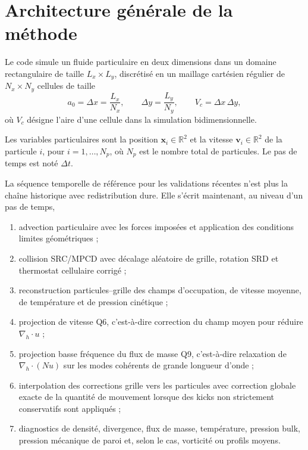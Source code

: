 \documentclass[11pt,a4paper]{article}
\begin{document}
\section{Architecture générale de la méthode}

Le code simule un fluide particulaire en deux dimensions dans un domaine rectangulaire de taille $L_x \times L_y$, discrétisé en un maillage cartésien régulier de $N_x \times N_y$ cellules de taille
\begin{equation}
 a_0 = \Delta x = \frac{L_x}{N_x},
 \qquad
 \Delta y = \frac{L_y}{N_y},
 \qquad
 V_c = \Delta x\,\Delta y,
\end{equation}
où $V_c$ désigne l'aire d'une cellule dans la simulation bidimensionnelle.

Les variables particulaires sont la position $\bm{x}_i \in \mathbb{R}^2$ et la vitesse $\bm{v}_i \in \mathbb{R}^2$ de la particule $i$, pour $i=1,\dots,N_p$, où $N_p$ est le nombre total de particules. Le pas de temps est noté $\Delta t$.

La séquence temporelle de référence pour les validations récentes n'est plus la chaîne historique avec redistribution dure. Elle s'écrit maintenant, au niveau d'un pas de temps,
\begin{enumerate}[label=\arabic*)]
  \item advection particulaire avec les forces imposées et application des conditions limites géométriques ;
  \item collision SRC/MPCD avec décalage aléatoire de grille, rotation SRD et thermostat cellulaire corrigé ;
  \item reconstruction particules--grille des champs d'occupation, de vitesse moyenne, de température et de pression cinétique ;
  \item projection de vitesse Q6, c'est-à-dire correction du champ moyen pour réduire \(\nabla_h\cdot u\) ;
  \item projection basse fréquence du flux de masse Q9, c'est-à-dire relaxation de \(\nabla_h\cdot(Nu)\) sur les modes cohérents de grande longueur d'onde ;
  \item interpolation des corrections grille vers les particules avec correction globale exacte de la quantité de mouvement lorsque des kicks non strictement conservatifs sont appliqués ;
  \item diagnostics de densité, divergence, flux de masse, température, pression bulk, pression mécanique de paroi et, selon le cas, vorticité ou profils moyens.
\end{enumerate}
\end{document}
